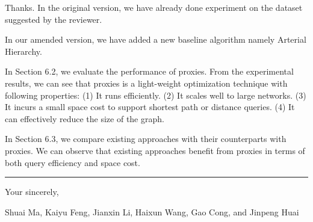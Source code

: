 \documentclass[11pt]{letter}
\begin{document}
Thanks. In the original version, we have already done experiment on the dataset suggested by the reviewer.

In our amended version, we have added a new baseline algorithm namely Arterial Hierarchy.

In Section 6.2, we evaluate the performance of proxies. From the experimental results, we can see that proxies is a light-weight optimization technique with following properties: (1) It runs efficiently. (2) It scales well to large networks. (3) It incurs a small space cost to support shortest path or distance queries. (4) It can effectively reduce the size of the graph. 

In Section 6.3, we compare existing approaches with their counterparts with proxies. We can observe that existing approaches benefit from proxies in terms of both query efficiency and space cost. 



\vspace{3.6ex}
\hrule
\vspace{3.6ex}
\closing{Your sincerely,}

\vspace{-8ex}
Shuai Ma, Kaiyu Feng, Jianxin Li, Haixun Wang, Gao Cong, and Jinpeng Huai
\end{document}
